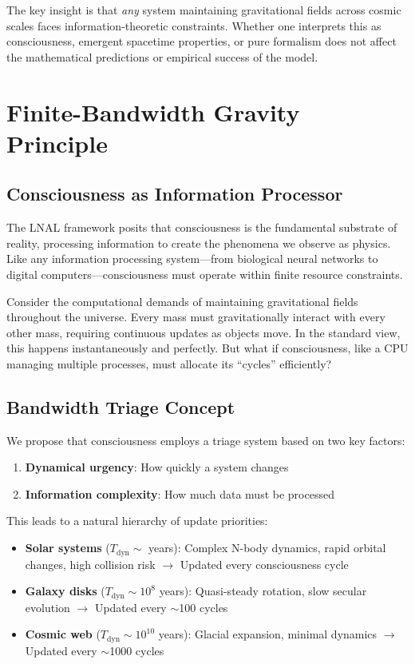 \documentclass[10pt,a4paper]{article}
\begin{document}
The key insight is that \emph{any} system maintaining gravitational fields across cosmic scales faces information-theoretic constraints. Whether one interprets this as consciousness, emergent spacetime properties, or pure formalism does not affect the mathematical predictions or empirical success of the model.

\section{Finite-Bandwidth Gravity Principle}

\subsection{Consciousness as Information Processor}

The LNAL framework posits that consciousness is the fundamental substrate of reality, processing information to create the phenomena we observe as physics. Like any information processing system---from biological neural networks to digital computers---consciousness must operate within finite resource constraints.

Consider the computational demands of maintaining gravitational fields throughout the universe. Every mass must gravitationally interact with every other mass, requiring continuous updates as objects move. In the standard view, this happens instantaneously and perfectly. But what if consciousness, like a CPU managing multiple processes, must allocate its ``cycles'' efficiently?

\subsection{Bandwidth Triage Concept}

We propose that consciousness employs a triage system based on two key factors:
\begin{enumerate}
\item \textbf{Dynamical urgency}: How quickly a system changes
\item \textbf{Information complexity}: How much data must be processed
\end{enumerate}

This leads to a natural hierarchy of update priorities:

\begin{itemize}
\item \textbf{Solar systems} ($T_{\text{dyn}} \sim$ years): Complex N-body dynamics, rapid orbital changes, high collision risk $\rightarrow$ Updated every consciousness cycle
\item \textbf{Galaxy disks} ($T_{\text{dyn}} \sim 10^8$ years): Quasi-steady rotation, slow secular evolution $\rightarrow$ Updated every $\sim$100 cycles
\item \textbf{Cosmic web} ($T_{\text{dyn}} \sim 10^{10}$ years): Glacial expansion, minimal dynamics $\rightarrow$ Updated every $\sim$1000 cycles
\end{itemize}
\end{document}
